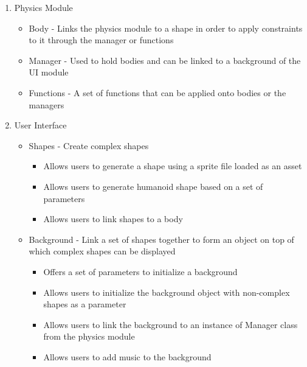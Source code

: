 \documentclass{scrreprt}
\begin{document}
\begin{enumerate}
\item Physics Module 
\begin{itemize}
	\item Body - Links the physics module to a shape in order to apply constraints to it through the manager or functions
	\item Manager - Used to hold bodies and can be linked to a background of the UI module
	\item Functions - A set of functions that can be applied onto bodies or the managers
\end{itemize}	
\item User Interface
\begin{itemize}
	\item Shapes - Create complex shapes
	\begin{itemize}
		\item Allows users to generate a shape using a sprite file loaded as an asset
		\item Allows users to generate humanoid shape based on a set of parameters
		\item Allows users to link shapes to a body
	\end{itemize}
	\item Background - Link a set of shapes together to form an object on top of which complex shapes can be displayed
	\begin{itemize}	
		\item Offers a set of parameters to initialize a background
		\item Allows users to initialize the background object with non-complex shapes as a parameter
		\item Allows users to link the background to an instance of Manager class from the physics module
		\item Allows users to add music to the background 
	\end{itemize}
\end{itemize}
\end{enumerate}	



	
\end{document}
